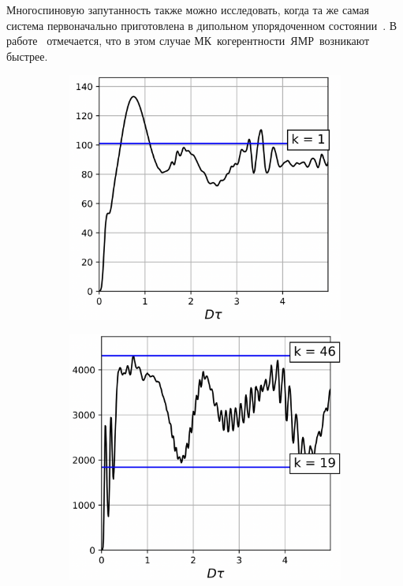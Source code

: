 Многоспиновую запутанность также можно исследовать,
когда та же самая система первоначально приготовлена в дипольном упорядоченном состоянии~\cite{Goldman1970}.
В работе~\cite{Doronin2011} отмечается,
что в этом случае МК~когерентности~ЯМР~возникают быстрее.

\begin{figure}[H]
  \centering
  \begin{subfigure}[t]{0.3\textwidth}
    \centering
    \includegraphics[width=\textwidth]{figures/result-nanopore-do-m2-by-time-beta1.png}
    \caption{\protect}
    \label{fig:result-nanopore-do-m2-by-time-beta1}
  \end{subfigure}
  \hfill
  \begin{subfigure}[t]{0.3\textwidth}
    \centering
    \includegraphics[width=\textwidth]{figures/result-nanopore-do-m2-by-time-beta2.png}

\end{subfigure}
\end{figure}
